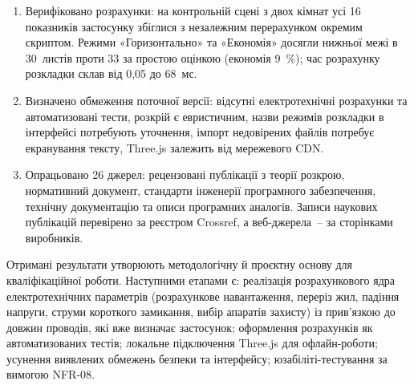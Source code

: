 \begin{enumerate}[noitemsep, topsep=0.3em, leftmargin=*, label=\arabic*.]
    \item Верифіковано розрахунки: на контрольній сцені з двох кімнат усі 16 показників застосунку збіглися з незалежним перерахунком окремим скриптом. Режими «Горизонтально» та «Економія» досягли нижньої межі в 30~листів проти 33 за простою оцінкою (економія 9~\%); час розрахунку розкладки склав від 0,05 до 68~мс.

    \item Визначено обмеження поточної версії: відсутні електротехнічні розрахунки та автоматизовані тести, розкрій є евристичним, назви режимів розкладки в інтерфейсі потребують уточнення, імпорт недовірених файлів потребує екранування тексту, Three.js залежить від мережевого CDN.

    \item Опрацьовано 26 джерел: рецензовані публікації з теорії розкрою, нормативний документ, стандарти інженерії програмного забезпечення, технічну документацію та описи програмних аналогів. Записи наукових публікацій перевірено за реєстром Crossref, а веб-джерела~-- за сторінками виробників.
\end{enumerate}

\vspace{0.5em}
Отримані результати утворюють методологічну й проєктну основу для кваліфікаційної роботи. Наступними етапами є: реалізація розрахункового ядра електротехнічних параметрів (розрахункове навантаження, переріз жил, падіння напруги, струми короткого замикання, вибір апаратів захисту) із прив'язкою до довжин проводів, які вже визначає застосунок; оформлення розрахунків як автоматизованих тестів; локальне підключення Three.js для офлайн-роботи; усунення виявлених обмежень безпеки та інтерфейсу; юзабіліті-тестування за вимогою NFR-08.
